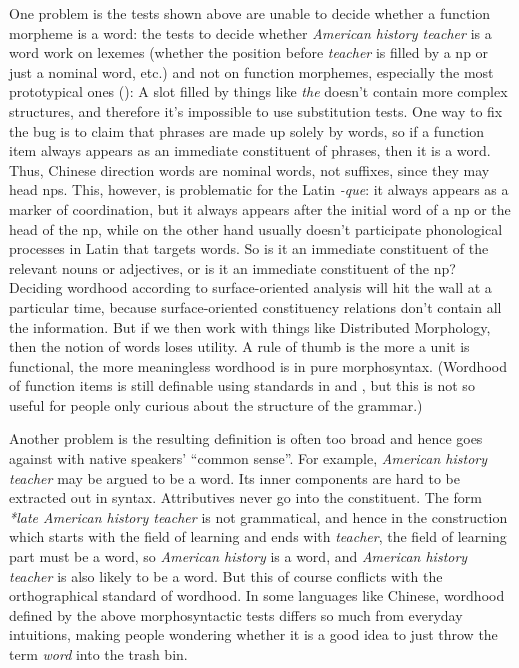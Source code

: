 \documentclass[UTF8, a4paper, oneside, scheme=plain]{ctexart}
\newcommand*{\term}[1]{\emph{#1}}
\newcommand*{\corpus}[1]{\emph{#1}}
\begin{document}
One problem is the tests shown above are unable to decide whether a function morpheme is a word:
the tests to decide whether \corpus{American history teacher} is a word work on lexemes 
(whether the position before \corpus{teacher} is filled by a \ac{np} or just a nominal word, etc.)
and not on function morphemes, especially the most prototypical ones
():
A slot filled by things like \corpus{the} doesn't contain more complex structures,
and therefore it's impossible to use substitution tests.
One way to fix the bug is to 
claim that phrases are made up solely by words,
so if a function item always appears as an immediate constituent of phrases,
then it is a word.
Thus, Chinese direction words are nominal words, not suffixes,
since they may head \ac{np}s.
This, however, is problematic for the Latin \corpus{-que}:
it always appears as a marker of coordination,
but it always appears after the initial word of a \ac{np} or the head of the \ac{np},
while on the other hand usually doesn't participate phonological processes in Latin that targets words.
So is it an immediate constituent of the relevant nouns or adjectives,
or is it an immediate constituent of the \ac{np}?
Deciding wordhood according to surface-oriented analysis will hit the wall at a particular time,
because surface-oriented constituency relations don't contain all the information.
But if we then work with things like Distributed Morphology,
then the notion of words loses utility.
A rule of thumb is the more a unit is functional,
the more meaningless wordhood is in pure morphosyntax.
(Wordhood of function items is still definable using standards 
in  and ,
but this is not so useful for people only curious about the structure of the grammar.)

Another problem is the resulting definition is often too broad and hence
goes against with native speakers' ``common sense''.
For example, \corpus{American history teacher} may be argued to be a word.
Its inner components are hard to be extracted out in syntax.
Attributives never go into the constituent.
The form \corpus{*late American history teacher} is not grammatical,
and hence in the construction which starts with the field of learning and ends with \corpus{teacher},
the field of learning part must be a word,
so \corpus{American history} is a word,
and \corpus{American history teacher} is also likely to be a word.
But this of course conflicts with the orthographical standard of wordhood.
In some languages like Chinese, 
wordhood defined by the above morphosyntactic tests 
differs so much from everyday intuitions,
making people wondering whether it is a good idea to just throw the term \term{word} into the trash bin.
\end{document}
